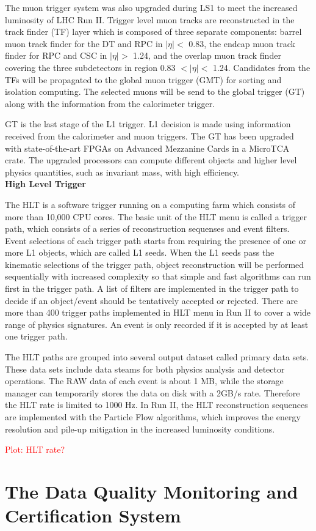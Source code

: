 \documentclass[thesis.tex]{subfiles}
\begin{document}
The muon trigger system was also upgraded during LS1 to meet the increased luminosity of LHC Run II. 
Trigger level muon tracks are reconstructed in the track finder (TF) layer which is composed of three separate components: barrel muon track finder for the DT and RPC in $|\eta| < $ 0.83, the endcap muon track finder for RPC and CSC in $|\eta| > $ 1.24, and the overlap muon track finder covering the three subdetectors in region 0.83 $< |\eta| <$ 1.24. 
Candidates from the TFs will be propagated to the global muon trigger (GMT) for sorting and isolation computing. 
The selected muons will be send to the global trigger (GT) along with the information from the calorimeter trigger.

GT is the last stage of the L1 trigger. 
L1 decision is made using information received from the calorimeter and muon triggers. 
The GT has been upgraded with state-of-the-art FPGAs on Advanced Mezzanine Cards in a MicroTCA crate.
The upgraded processors can compute different objects and higher level physics quantities, such as invariant mass, with high efficiency.
\\

\noindent \textbf{High Level Trigger}

The HLT is a software trigger running on a computing farm which consists of more than 10,000 CPU cores. 
The basic unit of the HLT menu is called a trigger path, which consists of a series of reconstruction sequenses and event filters. 
Event selections of each trigger path starts from requiring the presence of one or more L1 objects, which are called L1 seeds. 
When the L1 seeds pass the kinematic selections of the trigger path, object reconstruction will be performed sequentially with increased complexity so that simple and fast algorithms can run first in the trigger path. 
A list of filters are implemented in the trigger path to decide if an object/event should be tentatively accepted or rejected. 
There are more than 400 trigger paths implemented in HLT menu in Run II to cover a wide range of physics signatures.
An event is only recorded if it is accepted by at least one trigger path. 

The HLT paths are grouped into several output dataset called primary data sets. 
These data sets include data steams for both physics analysis and detector operations. 
The RAW data of each event is about 1 MB, while the storage manager can temporarily stores the data on disk with a 2GB/s rate. 
Therefore the HLT rate is limited to 1000 Hz.
In Run II, the HLT reconstruction sequences are implemented with the Particle Flow algorithms, which improves the energy resolution and pile-up mitigation in the increased luminosity conditions. 

\textcolor{red}{Plot: HLT rate?}


\section{The Data Quality Monitoring and Certification System}
\end{document}
